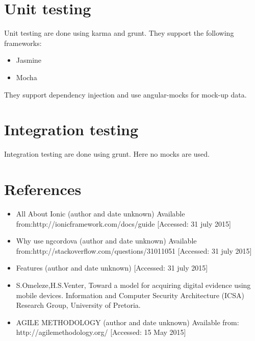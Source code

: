 \documentclass[a4paper,12pt]{article}
\begin{document}
\section{Unit testing}
Unit testing are done using karma and grunt. They support the following frameworks:
\begin{itemize}
\item Jasmine
\item Mocha
\end{itemize}
They support dependency injection and use angular-mocks for mock-up data.
\section{Integration testing}
Integration testing are done using grunt. Here no mocks are used.

\section{References}
\begin{itemize}
\item All About Ionic (author and date unknown) 
Available from:http://ionicframework.com/docs/guide
[Accessed: 31 july 2015]
\item Why use ngcordova (author and date unknown) 
Available from:http://stackoverflow.com/questions/31011051
[Accessed: 31 july 2015]
\item Features  (author and date unknown) 
[Accessed: 31 july 2015]
\item S.Omeleze,H.S.Venter, Toward a model for acquiring digital evidence using mobile devices. Information and Computer Security Architecture (ICSA) Research Group, University of Pretoria.
\item AGILE METHODOLOGY (author and date unknown)
	Available from: http://agilemethodology.org/ [Accessed: 15 May 2015]
\end{itemize}
\end{document}
